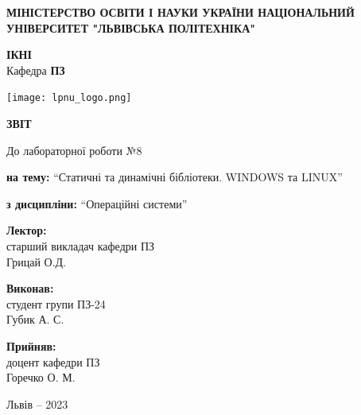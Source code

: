 \documentclass[12pt]{extarticle}
\begin{document}
\begin{titlepage}
    \begin{center}
        \textbf{\normalsize{\MakeUppercase{
            Міністерство Освіти і науки України
            Національний університет "Львівська політехніка"
        }}}

        \begin{flushright}
        \textbf{ІКНІ}\\
        Кафедра \textbf{ПЗ}
        \end{flushright}
        \vspace{15mm}

        \texttt{[image: lpnu\_logo.png]}

        \vspace*{\fill}

        \textbf{\normalsize{\MakeUppercase{Звіт}}}
            
        До лабораторної роботи №8

        \textbf{на тему:} “Статичні та динамічні бібліотеки. WINDOWS та LINUX”

        \textbf{з дисципліни:} “Операційні системи”
            
        \vspace*{\fill}

        \begin{flushright}

            \textbf{Лектор:}\\
            старший викладач кафедри ПЗ\\
            Грицай О.Д.\\
            \vspace{12pt}

            \textbf{Виконав:}\\
            студент групи ПЗ-24\\
            Губик А. С.\\
            \vspace{12pt}

            \textbf{Прийняв:}\\
            доцент кафедри ПЗ\\
            Горечко О. М.\\
        \vspace{12pt}
        \end{flushright}

        Львів -- 2023
            
            
    \end{center}
\end{titlepage}
\end{document}
